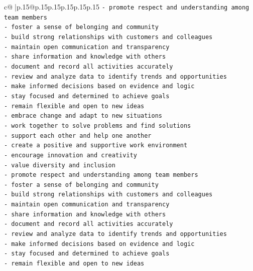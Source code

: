 \documentclass{article}
\begin{document}
{\begin{supertabular}{c@{$\;$}|p{.15\linewidth}@{}p{.15\linewidth}p{.15\linewidth}p{.15\linewidth}p{.15\linewidth}p{.15\linewidth}}
{{{\texttt{{-} promote respect and understanding among team members} \\
\texttt{{-} foster a sense of belonging and community} \\
\texttt{{-} build strong relationships with customers and colleagues} \\
\texttt{{-} maintain open communication and transparency} \\
\texttt{{-} share information and knowledge with others} \\
\texttt{{-} document and record all activities accurately} \\
\texttt{{-} review and analyze data to identify trends and opportunities} \\
\texttt{{-} make informed decisions based on evidence and logic} \\
\texttt{{-} stay focused and determined to achieve goals} \\
\texttt{{-} remain flexible and open to new ideas} \\
\texttt{{-} embrace change and adapt to new situations} \\
\texttt{{-} work together to solve problems and find solutions} \\
\texttt{{-} support each other and help one another} \\
\texttt{{-} create a positive and supportive work environment} \\
\texttt{{-} encourage innovation and creativity} \\
\texttt{{-} value diversity and inclusion} \\
\texttt{{-} promote respect and understanding among team members} \\
\texttt{{-} foster a sense of belonging and community} \\
\texttt{{-} build strong relationships with customers and colleagues} \\
\texttt{{-} maintain open communication and transparency} \\
\texttt{{-} share information and knowledge with others} \\
\texttt{{-} document and record all activities accurately} \\
\texttt{{-} review and analyze data to identify trends and opportunities} \\
\texttt{{-} make informed decisions based on evidence and logic} \\
\texttt{{-} stay focused and determined to achieve goals} \\
\texttt{{-} remain flexible and open to new ideas} \\
}}}
\end{supertabular}}
\end{document}
